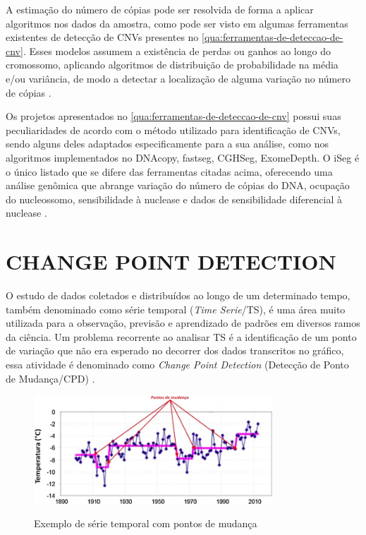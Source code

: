 A estimação do número de cópias pode ser resolvida de forma a aplicar algoritmos nos dados da amostra, como pode ser visto em algumas ferramentas existentes de detecção de CNVs presentes no \autoref{qua:ferramentas-de-deteccao-de-cnv}. Esses modelos assumem a existência de perdas ou ganhos ao longo do cromossomo, aplicando algoritmos de distribuição de probabilidade na média e/ou variância, de modo a detectar a localização de alguma variação no número de cópias \cite{Zhao2013}.



Os projetos apresentados no \autoref{qua:ferramentas-de-deteccao-de-cnv} possui suas peculiaridades de acordo com o método utilizado para identificação de CNVs, sendo alguns deles adaptados especificamente para a sua análise, como nos algoritmos implementados no DNAcopy, fastseg, CGHSeg, ExomeDepth. O iSeg é o único listado que se difere das ferramentas citadas acima, oferecendo uma análise genômica que abrange variação do número de cópias do DNA, ocupação do nucleossomo, sensibilidade à nuclease e dados de sensibilidade diferencial à nuclease \cite{Girimurugan2018}.

\section{CHANGE POINT DETECTION}
\label{sec:changePointDetection}

O estudo de dados coletados e distribuídos ao longo de um determinado tempo, também denominado como série temporal (\textit{Time Serie}/TS), é uma área muito utilizada para a observação, previsão e aprendizado de padrões em diversos ramos da ciência. Um problema recorrente ao analisar TS é a identificação de um ponto de variação que não era esperado no decorrer dos dados transcritos no gráfico, essa atividade é denominado como \textit{Change Point Detection} (Detecção de Ponto de Mudança/CPD) \cite{Aminikhanghahi2017}.

\begin{figure}[!htb]
    \centering
    \caption{Exemplo de série temporal com pontos de mudança}
    \includegraphics[width=0.8\textwidth]{./dados/figuras/pontos-de-mudanca}
    \label{fig:change-point}
\end{figure}

